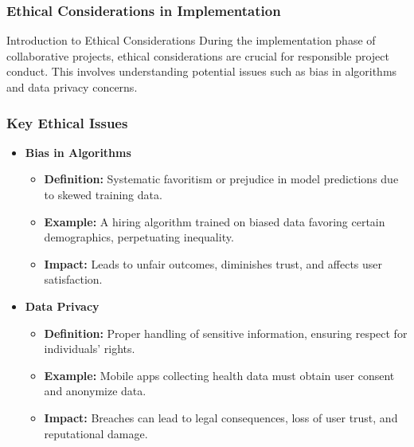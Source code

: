 \documentclass[aspectratio=169]{beamer}
\begin{document}
\begin{frame}[fragile]
    \frametitle{Ethical Considerations in Implementation}
    \begin{block}{Introduction to Ethical Considerations}
        During the implementation phase of collaborative projects, ethical considerations are crucial for responsible project conduct. This involves understanding potential issues such as bias in algorithms and data privacy concerns.
    \end{block}
\end{frame}

\begin{frame}[fragile]
    \frametitle{Key Ethical Issues}
    \begin{itemize}
        \item \textbf{Bias in Algorithms}
        \begin{itemize}
            \item \textbf{Definition:} Systematic favoritism or prejudice in model predictions due to skewed training data.
            \item \textbf{Example:} A hiring algorithm trained on biased data favoring certain demographics, perpetuating inequality.
            \item \textbf{Impact:} Leads to unfair outcomes, diminishes trust, and affects user satisfaction.
        \end{itemize}
        
        \item \textbf{Data Privacy}
        \begin{itemize}
            \item \textbf{Definition:} Proper handling of sensitive information, ensuring respect for individuals' rights.
            \item \textbf{Example:} Mobile apps collecting health data must obtain user consent and anonymize data.
            \item \textbf{Impact:} Breaches can lead to legal consequences, loss of user trust, and reputational damage.
        \end{itemize}
    \end{itemize}
\end{frame}
\end{document}
